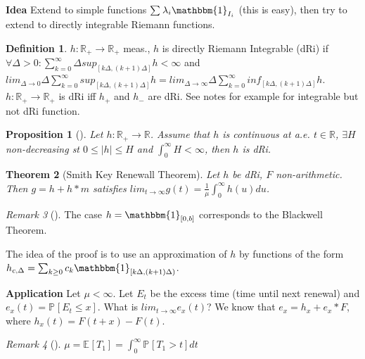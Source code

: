 \documentclass[12pt]{book}
\newtheorem{theorem}{Theorem}[section]
\newtheorem{prop}[theorem]{Proposition}
\theoremstyle{definition}
\newtheorem{defn}{Definition}[section]
\theoremstyle{remark}
\newtheorem{rmk}[theorem]{Remark}
\begin{document}
\textbf{Idea} Extend to simple functions $\sum_{}^{} \lambda_i \mathbbm{1}_{I_i}$ (this is easy), then try to extend to directly integrable Riemann functions.

\begin{defn}
	$h: \mathbb{R}_+ \to \mathbb{R}_+$ meas., $h$ is directly Riemann Integrable (dRi) if $\forall \Delta >0: \sum_{k=0}^{\infty}\Delta sup_{[k \Delta, (k+1)\Delta]} h < \infty$ and $lim_{\Delta \to 0} \Delta \sum_{k=0}^{\infty} sup_{[k \Delta,(k+1)\Delta] } h = lim _{\Delta \to \infty} \Delta \sum_{k=0}^{\infty} inf_{[k \Delta, (k+1)\Delta]}h$. $h: \mathbb{R}_+ \to \mathbb{R}_+$ is dRi iff $h_+$ and $h_-$ are dRi. See notes for example for integrable but not dRi function.
\end{defn}

\begin{prop}[]
	Let $h: \mathbb{R}_+ \to \mathbb{R}$. Assume that $h$ is continuous at a.e. $t \in \mathbb{R}$, $\exists H$ non-decreasing st $0 \leq |h| \leq H$ and $\int_{0}^{\infty} H < \infty$, then $h$ is dRi. 
\end{prop}

\begin{theorem}[Smith Key Renewall Theorem]
	Let $h$ be dRi, $F$ non-arithmetic. Then $g=h+h*m$ satisfies $lim_{t \to \infty}g(t)= \frac{1}{\mu } \int_{0}^{\infty} h(u) du$.
\end{theorem}

\begin{rmk}[]
	The case $h= \mathbbm{1}_{[0,b]}$ corresponds to the Blackwell Theorem. 
\end{rmk}

The idea of the proof is to use an approximation of $h$ by functions of the form $h_{c,\Delta}=\sum_{k\geq 0}^{} c_k \mathbbm{1} _{[k\Delta, (k+1)\Delta)}$.

\textbf{Application} Let $\mu < \infty$. Let $E_t$ be the excess time (time until next renewal) and $e_x(t) = \mathbb{P}_{} \left[ E_t \leq x \right] $. What is $lim_{t \to \infty} e_x(t)$? We know that $e_x = h_x + e_x*F$, where $h_x(t) = F(t+x)-F(t)$.

\begin{rmk}[]
	$\mu = \mathbb{E}_{} \left[ T_1 \right] = \int_{0}^{\infty} \mathbb{P}_{} \left[ T_1 > t \right] dt$
\end{rmk}
\end{document}
